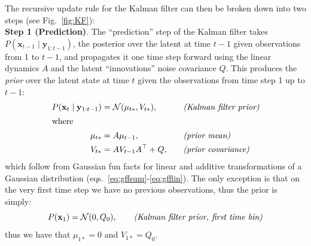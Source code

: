 \documentclass[10pt]{article}
\newcommand{\vx}{\mathbf{x}}
\newcommand{\vy}{\mathbf{y}}
\begin{document}


The recursive update rule for the Kalman filter can then be broken down into two steps (see Fig.~\ref{fig:KF}):\\

{\bf Step 1 (Prediction)}.  The ``prediction'' step of the Kalman
filter takes $P(\vx_{t-1} \mid \vy_{1:t-1})$, the posterior over the
latent at time $t-1$ given observations from 1 to $t-1$, and
propagates it one time step forward using the linear dynamics $A$ and
the latent ``innovations'' noise covariance $Q$. This produces the
{\it prior} over the latent state at time $t$ given the observations
from time step 1 up to $t-1$:
\begin{alignat}{2}
P(\vx_{t}\mid \vy_{1:t-1}) &= \Nrm(\mu_{t*}, V_{t*}),   \quad  & &
\text{\it (Kalman filter prior)} \label{eq:KFprior} \\
\intertext{where}
\mu_{t*} &=  A \mu_{t-1}, \quad  & & \text{\it
  (prior mean)} \label{eq:KFpriormean}
\\
 V_{t*} &= AV_{t-1}A\trp + Q, \quad & & \text{\it (prior covariance)} \label{eq:KFpriorcov}
\end{alignat}
which follow from Gaussian fun facts for linear and additive
transformations of a Gaussian distribution 
(eqs.~\ref{eq:gffsum}-\ref{eq:gfflin}).
The only exception  is that on the very first time
step we have no previous observations, thus the prior is simply:
\begin{equation}
  \label{eq:kfprior1}
P(\vx_1) = \Nrm(0,Q_0),  \qquad   \text{\it (Kalman filter prior, first
  time bin)}
\end{equation}
thus we have that $\mu_{1*}=0$ and $V_{1*} = Q_0$.

\end{document}
